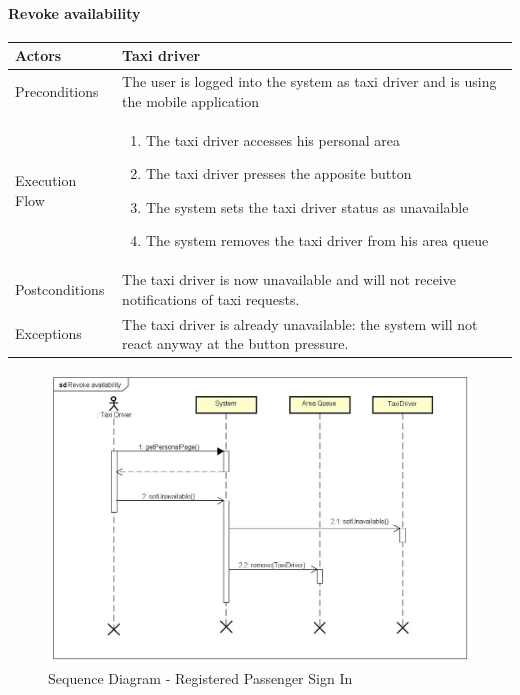 \paragraph{Revoke availability}
\begin{center}
	\begin{tabular}{ | l | p{8cm} |}
		\hline Actors & Taxi driver
		\\ \hline
		Preconditions &
		The user is logged into the system as taxi driver and is using the mobile application
		\\ \hline
		Execution Flow &
		\begin{enumerate}
			\item The taxi driver accesses his personal area
			\item The taxi driver presses the apposite button
			\item The system sets the taxi driver status as unavailable
			\item The system removes the taxi driver from his area queue
		\end{enumerate}
		\\ \hline
		Postconditions & 
		The taxi driver is now unavailable and will not receive notifications of taxi requests.
		\\ \hline
		Exceptions &
		The taxi driver is already unavailable: the system will not react anyway at the button
		pressure.
		\\ \hline
	\end{tabular}
\end{center}
\newpage
\begin{landscape}
\begin{figure}[!h]
	\begin{center}			
		\includegraphics[height=\textheight]{../SE2_SD/RevokeAvailability}
		\caption{Sequence Diagram - Registered Passenger Sign In}	
	\end{center}
\end{figure}
\end{landscape}
\newpage
